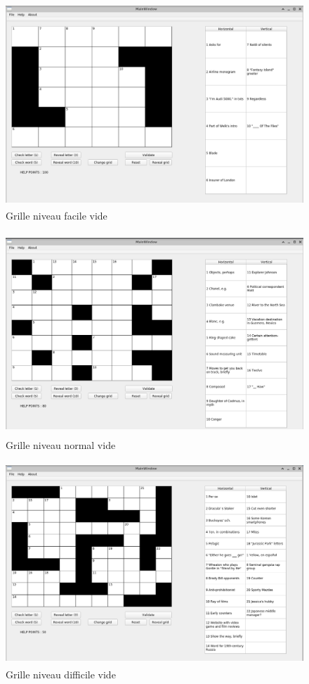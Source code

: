 \documentclass [ 11 pt ] {article}
\begin{document}
 \begin{figure}[H] 
 \center 
 \includegraphics[height=3in]{resultats/easy_vide.png}
 \caption{Grille niveau facile vide}
 \end{figure}
 \begin{figure}[H] 
 \center 
 \includegraphics[height=3in]{resultats/normal_vide.png}
 \caption{Grille niveau normal vide}
 \end{figure}
  \begin{figure}[H] 
 \center 
 \includegraphics[height=3in]{resultats/hard_vide.png}
 \caption{Grille niveau difficile vide}
 \end{figure}
 
\end{document}
